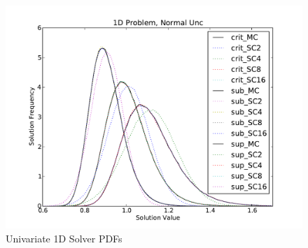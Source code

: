 \begin{figure}[h!]
\centering
   \includegraphics[width=.75\textwidth]{../graphics/1dall_normal_pdfs}
   \caption{Univariate 1D Solver PDFs}
   \label{fig:1d uni res}
\end{figure}


\newpage
